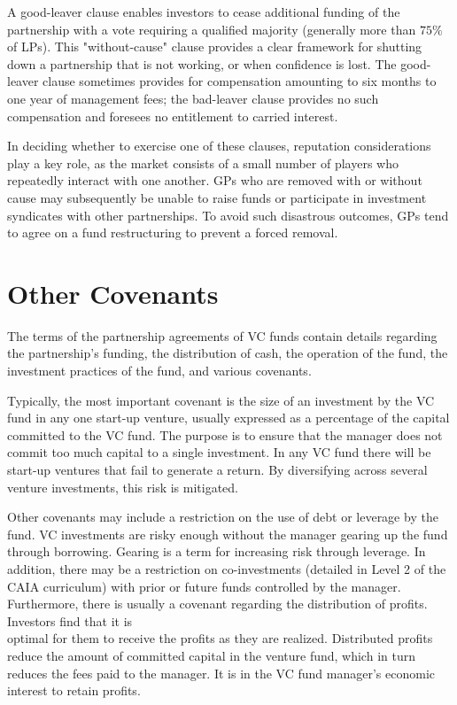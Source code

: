 \documentclass[11pt]{article}
\begin{document}
A good-leaver clause enables investors to cease additional funding of the partnership with a vote requiring a qualified majority (generally more than $75 \%$ of LPs). This "without-cause" clause provides a clear framework for shutting down a partnership that is not working, or when confidence is lost. The good-leaver clause sometimes provides for compensation amounting to six months to one year of management fees; the bad-leaver clause provides no such compensation and foresees no entitlement to carried interest.

In deciding whether to exercise one of these clauses, reputation considerations play a key role, as the market consists of a small number of players who repeatedly interact with one another. GPs who are removed with or without cause may subsequently be unable to raise funds or participate in investment syndicates with other partnerships. To avoid such disastrous outcomes, GPs tend to agree on a fund restructuring to prevent a forced removal.

\section*{Other Covenants}
The terms of the partnership agreements of VC funds contain details regarding the partnership's funding, the distribution of cash, the operation of the fund, the investment practices of the fund, and various covenants.

Typically, the most important covenant is the size of an investment by the VC fund in any one start-up venture, usually expressed as a percentage of the capital committed to the VC fund. The purpose is to ensure that the manager does not commit too much capital to a single investment. In any VC fund there will be start-up ventures that fail to generate a return. By diversifying across several venture investments, this risk is mitigated.

Other covenants may include a restriction on the use of debt or leverage by the fund. VC investments are risky enough without the manager gearing up the fund through borrowing. Gearing is a term for increasing risk through leverage. In addition, there may be a restriction on co-investments (detailed in Level 2 of the CAIA curriculum) with prior or future funds controlled by the manager. Furthermore, there is usually a covenant regarding the distribution of profits. Investors find that it is\\
optimal for them to receive the profits as they are realized. Distributed profits reduce the amount of committed capital in the venture fund, which in turn reduces the fees paid to the manager. It is in the VC fund manager's economic interest to retain profits.
\end{document}
